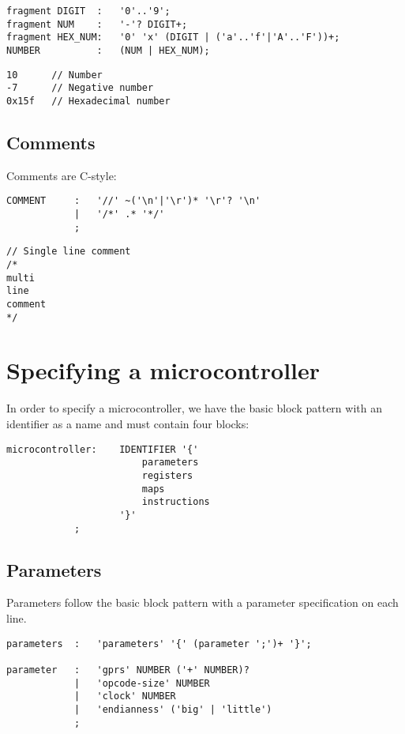 \lstset{caption=Number specifation}
\begin{lstlisting}
fragment DIGIT	:	'0'..'9';
fragment NUM	:	'-'? DIGIT+;
fragment HEX_NUM:	'0' 'x' (DIGIT | ('a'..'f'|'A'..'F'))+;
NUMBER			:	(NUM | HEX_NUM);
\end{lstlisting}

\lstset{caption=Example numbers}
\begin{lstlisting}
10		// Number
-7		// Negative number
0x15f	// Hexadecimal number
\end{lstlisting}

\subsection{Comments}
Comments are C-style:

\lstset{caption=Comment specifation}
\begin{lstlisting}
COMMENT		:	'//' ~('\n'|'\r')* '\r'? '\n'
			|	'/*' .* '*/'
			;
\end{lstlisting}

\lstset{caption=Example comments}
\begin{lstlisting}
// Single line comment
/*
multi
line
comment
*/
\end{lstlisting}

\section{Specifying a microcontroller}
In order to specify a microcontroller, we have the basic block pattern with an
identifier as a name and must contain four blocks:
\lstset{caption=Microcontroller specification}
\begin{lstlisting}
microcontroller:	IDENTIFIER '{'
						parameters
						registers
						maps
						instructions
					'}'
			;
\end{lstlisting}

\subsection{Parameters}
Parameters follow the basic block pattern with a parameter specification on
each line.

\lstset{caption=Parameter specification}
\begin{lstlisting}
parameters	:	'parameters' '{' (parameter ';')+ '}';

parameter	:	'gprs' NUMBER ('+' NUMBER)?
			|	'opcode-size' NUMBER
			|	'clock' NUMBER
			|	'endianness' ('big' | 'little')
			;
\end{lstlisting}

